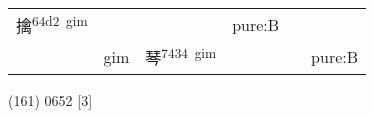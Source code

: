 \documentclass[14pt,a4paper]{scrartcl}
\begin{document}
\begin{longtable}[c]{@{}llllll@{}}
\begin{minipage}[t]{0.14\columnwidth}\raggedright\strut
擒\textsuperscript{64d2~gim}
\strut\end{minipage} &
\begin{minipage}[t]{0.14\columnwidth}\raggedright\strut
\strut\end{minipage} &
\begin{minipage}[t]{0.14\columnwidth}\raggedright\strut
\strut\end{minipage} &
\begin{minipage}[t]{0.14\columnwidth}\raggedright\strut
pure:B
\strut\end{minipage}\tabularnewline
\begin{minipage}[t]{0.14\columnwidth}\raggedright\strut
𤦡
\strut\end{minipage} &
\begin{minipage}[t]{0.14\columnwidth}\raggedright\strut
gim
\strut\end{minipage} &
\begin{minipage}[t]{0.14\columnwidth}\raggedright\strut
琴\textsuperscript{7434~gim}
\strut\end{minipage} &
\begin{minipage}[t]{0.14\columnwidth}\raggedright\strut
\strut\end{minipage} &
\begin{minipage}[t]{0.14\columnwidth}\raggedright\strut
\strut\end{minipage} &
\begin{minipage}[t]{0.14\columnwidth}\raggedright\strut
pure:B
\strut\end{minipage}\tabularnewline
\bottomrule
\end{longtable}

(161) 0652 {[}3{]}
\end{document}
